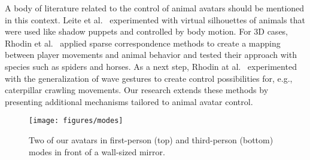 A body of literature related to the control of animal avatars should be mentioned in this context. Leite et al.~ experimented with virtual silhouettes of animals that were used like shadow puppets and controlled by body motion. For 3D cases, Rhodin et al.~ applied sparse correspondence methods to create a mapping between player movements and animal behavior and tested their approach with species such as spiders and horses. As a next step, Rhodin at al.~ experimented with the generalization of wave gestures to create control possibilities for, e.g., caterpillar crawling movements. Our research extends these methods by presenting additional mechanisms tailored to animal avatar control.



\begin{figure}
\centering
\texttt{[image: figures/modes]}
\caption{Two of our avatars in first-person (top) and third-person (bottom) modes in front of a wall-sized mirror.}
\label{fig:modes}
\end{figure}




%


